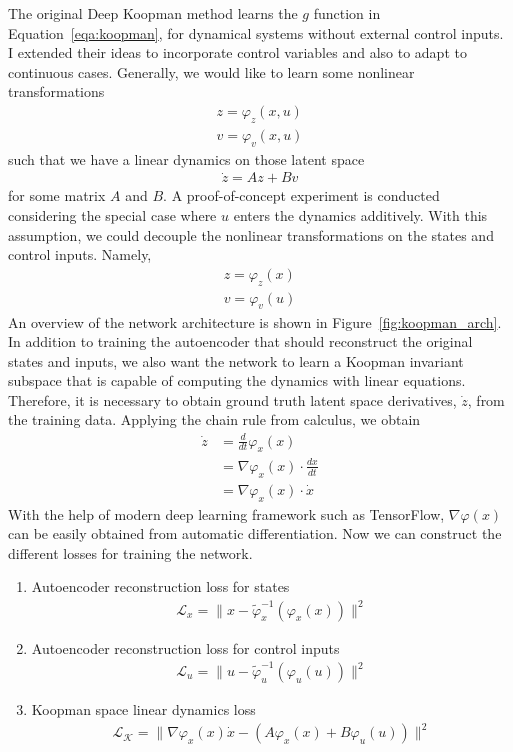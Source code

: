 \documentclass[10pt,twocolumn]{article}
\begin{document}
The original Deep Koopman method \cite{deepkoopman} learns the $g$ function in
Equation~\ref{eqa:koopman}, for dynamical systems without external control inputs.
I extended their ideas to incorporate control variables and also to adapt to continuous cases.
Generally, we would like to learn some nonlinear transformations
\begin{gather}
  z = \varphi_z(x, u) \\
  v = \varphi_v(x, u)
\end{gather}
such that we have a linear dynamics on those latent space
\begin{gather}
  \dot{z} = Az + Bv
\end{gather}
for some matrix $A$ and $B$. A proof-of-concept experiment is conducted considering
the special case where $u$ enters the dynamics additively.
With this assumption, we could decouple the nonlinear transformations on the states and
control inputs. Namely,
\begin{gather}
  z = \varphi_z(x) \\
  v = \varphi_v(u)
\end{gather}
An overview of the network architecture is shown in Figure~\ref{fig:koopman_arch}. In
addition to training the autoencoder that should reconstruct the original states and inputs,
we also want the network to learn a Koopman invariant subspace
that is capable of computing the dynamics with linear equations. Therefore, it is necessary
to obtain ground truth latent space derivatives, $\dot{z}$, from the training data.
Applying the chain rule from calculus, we obtain
\begin{equation}
  \begin{aligned}
    \dot{z} &= \frac{d}{dt} \varphi_x(x) \\
            &= \nabla \varphi_x(x) \cdot \frac{dx}{dt} \\
            &= \nabla \varphi_x(x) \cdot \dot{x}
  \end{aligned}
\end{equation}
With the help of modern deep learning framework such as TensorFlow, $\nabla \varphi(x)$ can
be easily obtained from automatic differentiation. Now we can construct the different losses
for training the network.
\begin{enumerate}
  \item Autoencoder reconstruction loss for states
    \begin{gather}
      \mathcal{L}_x = \| x - \tilde{\varphi}_x^{-1}(\varphi_x(x)) \|^2
    \end{gather}

  \item Autoencoder reconstruction loss for control inputs
    \begin{gather}
      \mathcal{L}_u = \| u - \tilde{\varphi}_u^{-1}(\varphi_u(u)) \|^2
    \end{gather}

  \item Koopman space linear dynamics loss
    \begin{gather}
      \mathcal{L}_{\mathcal{K}} = \| \nabla \varphi_x(x) \dot{x} -
                                     (A\varphi_x(x) + B\varphi_u(u) ) \|^2
    \end{gather}
\end{enumerate}
\end{document}
